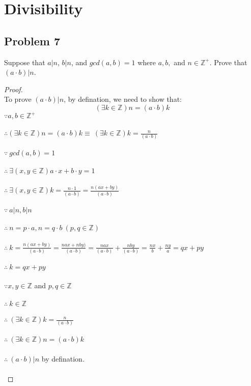 \documentclass[paper=a4, fontsize=11pt]{scrartcl} %
\numberwithin{equation}{section} %
\numberwithin{figure}{section} %
\numberwithin{table}{section} %
\newcommand{\problem}[1]{\subsection *{Problem #1}}
\newcommand{\pnl}{$ $\newline\\}
\newcommand{\Z}{\mathbb{Z}}
\begin{document}
\section {Divisibility}
\problem 7
Suppose that $a|n$, $b|n$, and $gcd(a, b) = 1$ where $a, b,$ and $n \in \Z^+$.
Prove that $(a \cdot b)|n$.
\begin{proof}
\pnl
To prove $(a \cdot b)|n$, by defination, we need to show that:\\
$$(\exists k \in \Z) n = (a \cdot b) k$$
$\because a, b \in \Z^+$\\\\
$\therefore(\exists k \in \Z) n = (a \cdot b) k \equiv \ (\exists k \in \Z) k = \frac{n}{(a \cdot b)} $\\\\
$\because \ gcd(a, b) = 1$\\\\
$\therefore \ \exists (x,y \in \Z) a\cdot x+b\cdot y = 1 $\\\\
$\therefore \ \exists (x,y \in \Z) k = \frac{n \cdot 1}{(a \cdot b)} = \frac{n(ax+by)}{(a \cdot b)} $\\\\
$\because \ a|n, b|n$\\\\
$\therefore \ n = p\cdot a, n = q\cdot b \ (p,q \in \Z)$\\\\
$\therefore \ k = \frac{n(ax+by)}{(a \cdot b)} = \frac{nax+nby)}{(a \cdot b)} = \frac{nax}{(a \cdot b)} + \frac{nby}{(a \cdot b)} = \frac{nx}{b} + \frac{ny}{a} = qx + py$\\\\
$\therefore \ k = qx+py$\\\\
$\because x,y \in \Z$ and $p,q \in \Z$\\\\
$\therefore \ k \in \Z$\\\\
$\therefore \ (\exists k \in \Z) k = \frac{n}{(a \cdot b)}$\\\\
$\therefore \ (\exists k \in \Z) n = (a \cdot b) k$\\\\
$\therefore \ (a \cdot b)|n$ by defination.\\\\

\end{proof}
\end{document}
